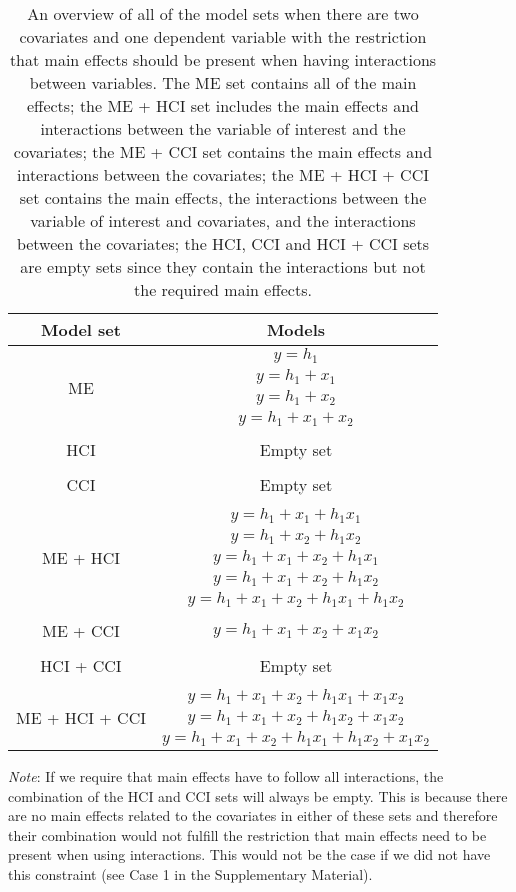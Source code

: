 \begin{table}[hbt!]
\centering
\caption{}
\caption*{\footnotesize An overview of all of the model sets when there are two covariates and one dependent variable with the restriction that main effects should be present when having interactions between variables. The ME set contains all of the main effects; the ME + HCI set includes the main effects and interactions between the variable of interest and the covariates; the ME + CCI set contains the main effects and  interactions between the covariates; the ME + HCI + CCI set contains the main effects, the interactions between the variable of interest and covariates, and the interactions between the covariates; the HCI, CCI and HCI + CCI sets are empty sets since they contain the interactions but not the required main effects.}
\begin{threeparttable}
\begin{tabular}{cc}
\toprule
Model set & Models \\ 
\midrule
\multirow{4}{*}{ME} & $y=h_1$ \\ & $y=h_1+x_1$ \\ & $y=h_1+x_2$ \\ & $y=h_1+x_1+x_2$  \\ & \\
\multirow{1}{*}{HCI} & Empty set  \\& \\
CCI & Empty set  \\ & \\
\multirow{5}{*}{ME + HCI} & $y=h_1+x_1+h_1x_1$  \\ & $y=h_1+x_2+h_1x_2$  \\& $y=h_1+x_1+x_2+h_1x_1$  \\& $y=h_1+x_1+x_2+h_1x_2$  \\& $y=h_1+x_1+x_2+h_1x_1+h_1x_2$ \\ & \\
ME + CCI & $y=h_1+x_1+x_2+x_1x_2$ \\ & \\
HCI + CCI & Empty set \\ & \\
\multirow{3}{*}{ME + HCI + CCI} & $y=h_1+x_1+x_2+h_1x_1+x_1x_2$ \\ & $y=h_1+x_1+x_2+h_1x_2+x_1x_2$ \\ & $y=h_1+x_1+x_2+h_1x_1+h_1x_2+x_1x_2$ \\
\bottomrule
\end{tabular}
\begin{tablenotes}
\textit{Note}: If we require that main effects have to follow all interactions, the combination of the HCI and CCI sets will always be empty. This is because there are no main effects related to the covariates in either of these sets and therefore their combination would not fulfill the restriction that main effects need to be present when using interactions. This would not be the case if we did not have this constraint (see Case 1 in the Supplementary Material).
\end{tablenotes}
\end{threeparttable}
\end{table}

